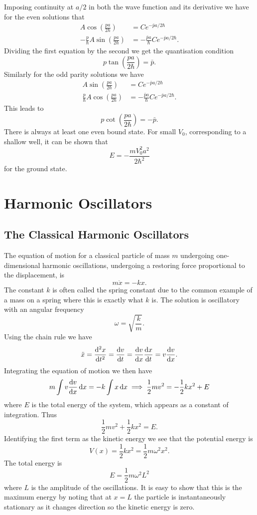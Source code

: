    Imposing continuity at \(a/2\) in both the wave function and its derivative we have for the even solutions that
    \begin{align*}
        A\cos\left(\frac{pa}{2\hbar}\right) &= Ce^{-\bar{p}a/2\hbar}\\
        -\frac{p}{\hbar}A\sin\left(\frac{pa}{2\hbar}\right) &= -\frac{\bar{p}a}{\hbar}Ce^{-\bar{p}a/2\hbar}.
    \end{align*}
    Dividing the first equation by the second we get the quantisation condition
    \[p\tan\left(\frac{pa}{2\hbar}\right) = \bar{p}.\]
    Similarly for the odd parity solutions we have
    \begin{align*}
        A\sin\left(\frac{pa}{2\hbar}\right) &= Ce^{-\bar{p}a/2\hbar}\\
        \frac{p}{\hbar}A\cos\left(\frac{pa}{2\hbar}\right) &= -\frac{\bar{p}a}{\hbar}Ce^{-\bar{p}a/2\hbar}.
    \end{align*}
    This leads to
    \[p\cot\left(\frac{pa}{2\hbar}\right) = -\bar{p}.\]
    There is always at least one even bound state.
    For small \(V_0\), corresponding to a shallow well, it can be shown that
    \[E = -\frac{mV_0^2a^2}{2\hbar^2}\]
    for the ground state.
    
    \section{Harmonic Oscillators}
    \subsection{The Classical Harmonic Oscillators}
    The equation of motion for a classical particle of mass \(m\) undergoing one-dimensional harmonic oscillations, undergoing a restoring force proportional to the displacement, is
    \[m\ddot{x} = -kx.\]
    The constant \(k\) is often called the spring constant due to the common example of a mass on a spring where this is exactly what \(k\) is.
    The solution is oscillatory with an angular frequency
    \[\omega = \sqrt{\frac{k}{m}}.\]
    Using the chain rule we have
    \[\ddot{x} = \dv[2]{x}{t} = \dv{v}{t} = \dv{v}{x}\dv{x}{t} = v\dv{v}{x}.\]
    Integrating the equation of motion we then have
    \[m\int v\dv{v}{x}\dd{x} = -k\int x\dd{x} \implies \frac{1}{2}mv^2 = -\frac{1}{2}kx^2 + E\]
    where \(E\) is the total energy of the system, which appears as a constant of integration.
    Thus
    \[\frac{1}{2}mv^2 + \frac{1}{2}kx^2 = E.\]
    Identifying the first term as the kinetic energy we see that the potential energy is
    \[V(x) = \frac{1}{2}kx^2 = \frac{1}{2}m\omega^2x^2.\]
    The total energy is
    \[E = \frac{1}{2}m\omega^2L^2\]
    where \(L\) is the amplitude of the oscillations.
    It is easy to show that this is the maximum energy by noting that at \(x = L\) the particle is instantaneously stationary as it changes direction so the kinetic energy is zero.
    
